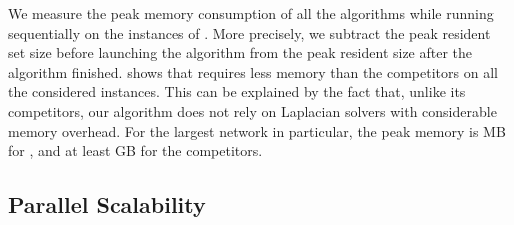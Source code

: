 We measure the peak memory consumption of all the algorithms while running
sequentially on the instances of
.
More precisely, we subtract the peak resident set size before launching
the algorithm from the peak resident size after the algorithm finished.
 shows that \ust requires less memory than the
competitors on all the considered instances. This can be explained by the
fact that, unlike its competitors, our algorithm does not rely on Laplacian
solvers with considerable memory overhead.
For the largest network in particular, the peak memory is \ustMemPR MB for
\ust, and at least \lamgMemPR GB for the competitors.

\subsection{Parallel Scalability}
\label{sec:el-clos:par-scal}
